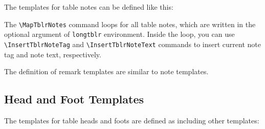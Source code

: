 \documentclass[oneside]{book}
\begin{document}
The templates for table notes can be defined like this:

\begin{codehigh}
\end{codehigh}
\begin{codehigh}
\end{codehigh}

The \verb!\MapTblrNotes! command loops for all table notes,
which are written in the optional argument of \verb!longtblr! environment.
Inside the loop, you can use \verb!\InsertTblrNoteTag! and \verb!\InsertTblrNoteText!
commands to insert current note tag and note text, respectively.

The definition of remark templates are similar to note templates.
\nopagebreak
\begin{codehigh}
\end{codehigh}
\begin{codehigh}
\end{codehigh}

\subsection{Head and Foot Templates}

The templates for table heads and foots are defined as including other templates:

\begin{codehigh}
\end{codehigh}
\end{document}
